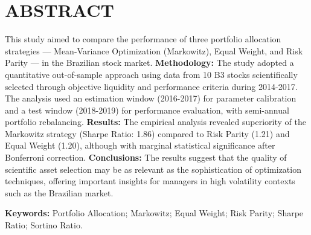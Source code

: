 
\chapter*{ABSTRACT}

\vspace{1cm}

This study aimed to compare the performance of three portfolio allocation strategies --- Mean-Variance Optimization (Markowitz), Equal Weight, and Risk Parity --- in the Brazilian stock market. \textbf{Methodology:} The study adopted a quantitative out-of-sample approach using data from 10 B3 stocks scientifically selected through objective liquidity and performance criteria during 2014-2017. The analysis used an estimation window (2016-2017) for parameter calibration and a test window (2018-2019) for performance evaluation, with semi-annual portfolio rebalancing. \textbf{Results:} The empirical analysis revealed superiority of the Markowitz strategy (Sharpe Ratio: 1.86) compared to Risk Parity (1.21) and Equal Weight (1.20), although with marginal statistical significance after Bonferroni correction. \textbf{Conclusions:} The results suggest that the quality of scientific asset selection may be as relevant as the sophistication of optimization techniques, offering important insights for managers in high volatility contexts such as the Brazilian market.

\vspace{0.5cm}

\noindent
\textbf{Keywords:} Portfolio Allocation; Markowitz; Equal Weight; Risk Parity; Sharpe Ratio; Sortino Ratio.